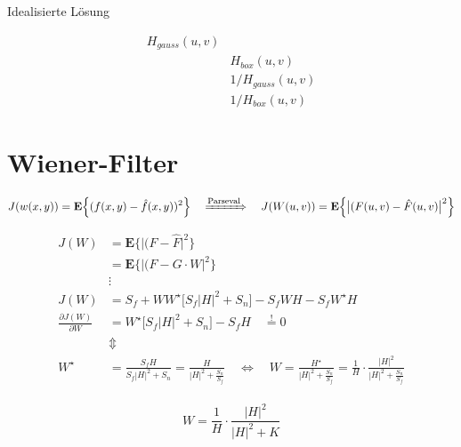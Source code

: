 \documentclass{article}
\begin{document}
Idealisierte Lösung

\begin{align*}
    H_{gauss}(u,v) \\
    & H_{box}(u,v) \\
    & 1/H_{gauss}(u,v) \\
    & 1/H_{box}(u,v) 
\end{align*}


\newpage
\section{Wiener-Filter}

\begin{equation}
    J(w(x,y)) = \mathbf{E}\Big\{ (f(x,y) - \hat{f}(x,y))^2 \Big\} 
    \quad \xRightarrow{\text{Parseval}} \quad
    J(W(u,v)) = \mathbf{E}\Big\{ \big|(F(u,v) - \hat{F}(u,v)\big|^2 \Big\}  
\end{equation}
   

\begin{align*}
     J(W) &= \mathbf{E}\Big\{ \big|(F - \hat{F}\big|^2 \Big\} \\
     &= \mathbf{E}\Big\{ \big|(F -  G \cdot W \big|^2 \Big\} \\
     &\vdots \\
     J(W) &= S_f + W W^\star \Big[ S_f |H|^2 + S_n \Big] - S_f W H - S_f W^\star H \\
     \frac{\partial J(W)}{\partial W} &= W^\star  \Big[ S_f |H|^2 + S_n \Big] - S_f H \quad \stackrel{!}{=} 0 \\
     &\Updownarrow \\
     W^\star &= \frac{S_f H}{S_f |H|^2 + S_n} = \frac{H}{|H|^2 + \frac{S_n}{S_f}} 
     \quad \Leftrightarrow \quad
     W = \frac{H^\star}{|H|^2 + \frac{S_n}{S_f}} = 
     \frac{1}{H} \cdot \frac{|H|^2}{|H|^2 + \frac{S_n}{S_f}}\\
\end{align*}

\begin{equation}
     W = \frac{1}{H} \cdot \frac{|H|^2}{|H|^2 + K}
\end{equation}
\end{document}
